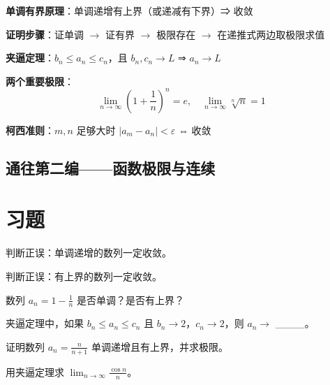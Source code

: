\begin{progressbox}
\textbf{单调有界原理}：单调递增有上界（或递减有下界）⇒ 收敛

\textbf{证明步骤}：证单调 $\to$ 证有界 $\to$ 极限存在 $\to$ 在递推式两边取极限求值

\textbf{夹逼定理}：\(b_n \le a_n \le c_n\)，且 \(b_n, c_n \to L\) ⇒ \(a_n \to L\)

\textbf{两个重要极限}：
\[
\lim_{n\to\infty} \left(1 + \frac{1}{n}\right)^n = e,\quad
\lim_{n\to\infty} \sqrt[n]{n} = 1
\]

\textbf{柯西准则}：\(m,n\) 足够大时 \(|a_m - a_n| < \varepsilon\) ⇔ 收敛
\end{progressbox}

\subsection*{通往第二编——函数极限与连续}


\section{习题}


\begin{exercise}[0]
判断正误：单调递增的数列一定收敛。
\end{exercise}

\begin{exercise}[0]
判断正误：有上界的数列一定收敛。
\end{exercise}

\begin{exercise}[0]
数列 \(a_n = 1 - \frac{1}{n}\) 是否单调？是否有上界？
\end{exercise}

\begin{exercise}[0]
夹逼定理中，如果 \(b_n \le a_n \le c_n\) 且 \(b_n \to 2\)，\(c_n \to 2\)，则 \(a_n \to\) \_\_\_\_。
\end{exercise}


\begin{exercise}[1]
证明数列 \(a_n = \frac{n}{n+1}\) 单调递增且有上界，并求极限。
\end{exercise}

\begin{exercise}[1]
用夹逼定理求 \(\displaystyle \lim_{n\to\infty} \frac{\cos n}{n}\)。
\end{exercise}

